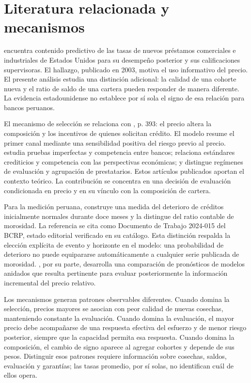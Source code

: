\documentclass[11pt]{article}
\theoremstyle{definition}\newtheorem{assumption}{Supuesto}
\begin{document}
\section{Literatura relacionada y mecanismos}
\citet{morgan2003} encuentra contenido predictivo de las tasas de nuevos
préstamos comerciales e industriales de Estados Unidos para su desempeño
posterior y sus calificaciones supervisoras. El hallazgo, publicado en 2003,
motiva el uso informativo del precio. El presente análisis estudia una
distinción adicional: la calidad de una cohorte nueva y el ratio de saldo de
una cartera pueden responder de manera diferente. La evidencia estadounidense
no establece por sí sola el signo de esa relación para bancos peruanos.

El mecanismo de selección se relaciona con \citet{stiglitz1981}, p. 393:
el precio altera la composición y los incentivos de quienes solicitan crédito.
El modelo resume el primer canal mediante una sensibilidad positiva del riesgo
previo al precio. \citet{broecker1990} estudia pruebas imperfectas y competencia
entre bancos; \citet{ruckes2004} relaciona estándares crediticios y competencia
con las perspectivas económicas; y \citet{dellariccia2006} distingue regímenes
de evaluación y agrupación de prestatarios. Estos artículos publicados aportan
el contexto teórico. La contribución se concentra en una decisión de evaluación
condicionada en precio y en su vínculo con la composición de cartera.

Para la medición peruana, \citet{yamunaque2024} construye una medida del
deterioro de créditos inicialmente normales durante doce meses y la distingue
del ratio contable de morosidad. La referencia se cita como Documento de
Trabajo 2024-015 del BCRP, estado editorial verificado en su catálogo. Esta
distinción respalda la elección explícita de evento y horizonte en el modelo:
una probabilidad de deterioro no puede equipararse automáticamente a cualquier
serie publicada de morosidad. \citet{clark2007}, por su parte, desarrolla una
comparación de pronósticos de modelos anidados que resulta pertinente para
evaluar posteriormente la información incremental del precio relativo.

Los mecanismos generan patrones observables diferentes. Cuando domina la
selección, precios mayores se asocian con peor calidad de nuevas cosechas,
manteniendo constante la evaluación. Cuando domina la evaluación, el mayor
precio debe acompañarse de una respuesta efectiva del esfuerzo y de menor
riesgo posterior, siempre que la capacidad permita esa respuesta. Cuando
domina la composición, el cambio de signo aparece al agregar cohortes y
depende de sus pesos. Distinguir esos patrones requiere información sobre
cosechas, saldos, evaluación y garantías; las tasas promedio, por sí solas,
no identifican cuál de ellos opera.
\end{document}
